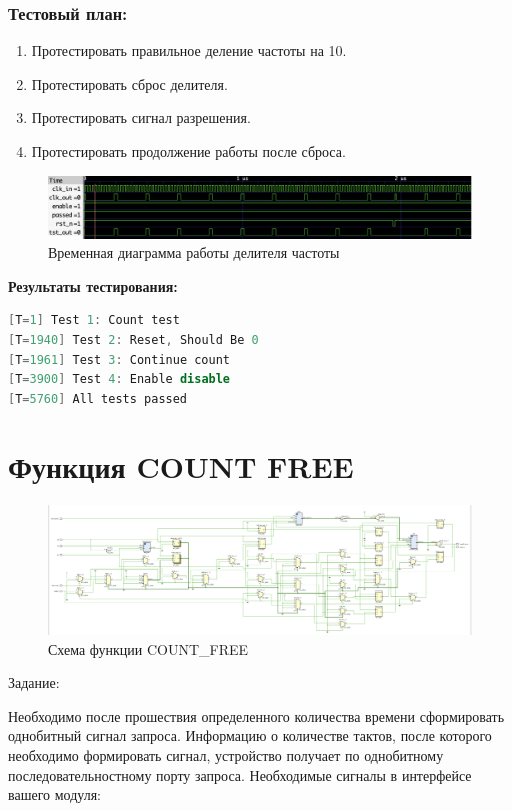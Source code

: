 \documentclass[12pt,onecolumn]{article}
\begin{document}
\subsubsection{Тестовый план:}
\begin{enumerate}
  \item Протестировать правильное деление частоты на 10.
  \item Протестировать сброс делителя.
  \item Протестировать сигнал разрешения.
  \item Протестировать продолжение работы после сброса.
\end{enumerate}

\begin{figure}[H]
  \centering
  \includegraphics[width=\textwidth]{image/freq-div-diagram.png}
  \caption{Временная диаграмма работы делителя частоты}
\end{figure}

\textbf{Результаты тестирования:}

\begin{lstlisting}[language=verilog]
[T=1] Test 1: Count test
[T=1940] Test 2: Reset, Should Be 0
[T=1961] Test 3: Continue count
[T=3900] Test 4: Enable disable
[T=5760] All tests passed
\end{lstlisting}

\section{Функция COUNT FREE}
\begin{figure}[H]
  \centering
  \includegraphics[width=\textwidth]{image/count-free.png}
  \caption{Схема функции COUNT\_FREE}
\end{figure}
Задание:

Необходимо после прошествия определенного количества времени сформировать однобитный сигнал запроса. Информацию о количестве тактов, после которого необходимо формировать сигнал, устройство получает по однобитному последовательностному порту запроса. Необходимые сигналы в интерфейсе вашего модуля:
\end{document}
